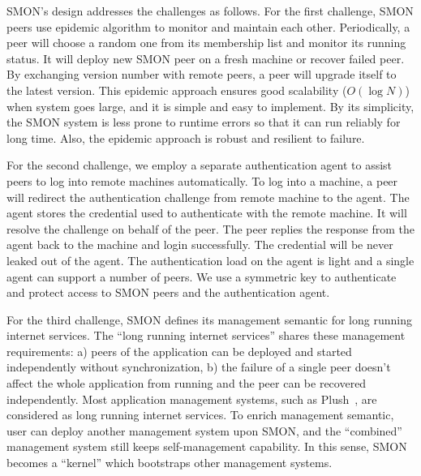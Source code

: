 SMON's design addresses the challenges as follows. For the
first challenge, SMON peers use epidemic algorithm to
monitor and maintain each other. Periodically, a peer will
choose a random one from its membership list and monitor its
running status. It will deploy new SMON peer on a fresh
machine or recover failed peer. 
By exchanging version number with remote peers, a peer will
upgrade itself to the latest version.  This epidemic
approach ensures good scalability ($O(\log N)$) when system
goes large, and it is simple and easy to implement. By its
simplicity, the SMON system is less prone to runtime errors
so that it can run reliably for long time. Also, the
epidemic approach is robust and resilient to failure.


For the second challenge, we employ a separate
authentication agent to assist peers to log into remote
machines automatically. To log into a machine, a peer will
redirect the authentication challenge from remote machine to
the agent. The agent stores the credential used to
authenticate with the remote machine. It will resolve the
challenge on behalf of the peer. The peer replies the
response from the agent back to the machine and login
successfully. The credential will be never leaked out of the
agent. The authentication load on the agent is light and a
single agent can support a number of peers.  We use a
symmetric key to authenticate and protect access to SMON
peers and the authentication agent.

For the third challenge, SMON defines its management
semantic for long running internet services. The ``long
running internet services'' shares these management
requirements: a) peers of the application can be deployed
and started independently without synchronization, b) the
failure of a single peer doesn't affect the whole
application from running and the peer can be recovered
independently.
Most application management systems, such as
Plush~\cite{Albrecht2007},
are considered as long running internet services. To enrich
management semantic, user can deploy another management
system upon SMON, and the ``combined'' management system
still keeps self-management capability. In this sense, SMON
becomes a ``kernel'' which bootstraps other management
systems.


